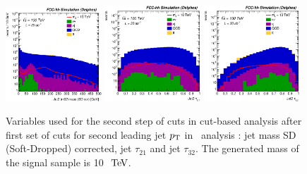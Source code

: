 \begin{figure}[!htb]\centering
\includegraphics[width=0.32\textwidth]{Fig/Zptt/Jet2_trk02_SD_Cor_m_sel1_nostack_log.eps}
\includegraphics[width=0.32\textwidth]{Fig/Zptt/Jet2_tau21_sel1_nostack_log.eps}
\includegraphics[width=0.32\textwidth]{Fig/Zptt/Jet2_tau32_sel1_nostack_log.eps}
\caption{Variables used for the second step of cuts in cut-based analysis after first set of cuts for second leading jet $p\sb{\scriptstyle\mathrm{T}}$ in \zptt\ analysis : jet mass SD (Soft-Dropped) corrected, jet $\tau_{21}$ and jet $\tau_{32}$. The generated mass of the signal sample is 10 $\TeV$.}
\label{fig:Zptt_sel1_cut}
\end{figure}

